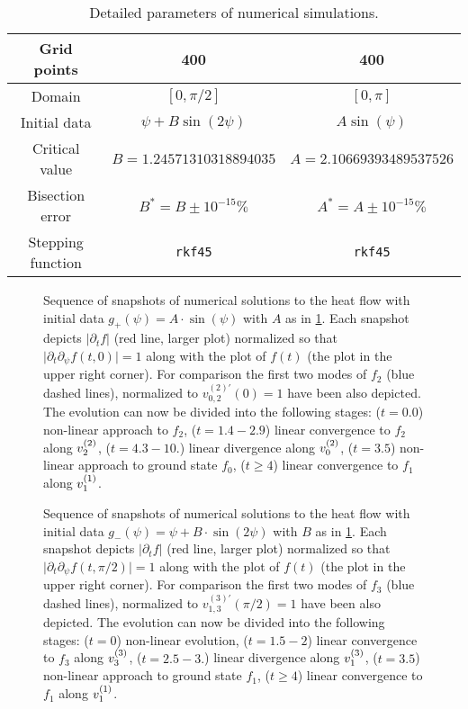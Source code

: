 \begin{table}[ht]
  \centering
  \begin{tabular}{|c|c|c|}\hline
    Grid points       & 400                     & 400                     \\\hline
    Domain            & $[0,\pi/2]$             & $[0,\pi]$               \\\hline
    Initial data      & $\psi+B\sin(2\psi)$     & $A\sin(\psi)$           \\\hline
    Critical value    & $B=1.24571310318894035$ & $A=2.10669393489537526$ \\\hline
    Bisection error   & $B^*=B\pm10^{-15}\%$    & $A^*=A\pm10^{-15}\%$    \\\hline
    Stepping function & \verb|rkf45|            & \verb|rkf45|            \\\hline
  \end{tabular}
  \caption{Detailed parameters of numerical simulations.}
  \label{tab:num_details}
\end{table}


\begin{figure}[h]
  \centering \advance\leftskip-3cm
  
  \caption{Sequence of snapshots of numerical solutions to the heat
    flow with initial data $g_+(\psi)=A\cdot \sin(\psi)$ with $A$ as
    in \ref{tab:num_details}. Each snapshot depicts $\lvert \partial_t
    f\rvert$ (red line, larger plot) normalized so that
    $\lvert \partial_t\partial_\psi f(t,0)\rvert=1$ along with the
    plot of $f(t)$ (the plot in the upper right corner). For
    comparison the first two modes of $f_2$ (blue dashed lines),
    normalized to $v_{0,2}^{(2)\prime}(0)=1$ have been also
    depicted. The evolution can now be divided into the following
    stages: ($t=0.0$) non-linear approach to $f_2$, ($t=1.4-2.9$)
    linear convergence to $f_2$ along $v_{2}^{(2)}$, ($t=4.3-10.$)
    linear divergence along $v_{0}^{(2)}$, ($t=3.5$) non-linear approach
    to ground state $f_0$, ($t\ge4$) linear convergence to $f_1$ along
    $v_{1}^{(1)}$.}\label{fig:snapshot_f2}
\end{figure}

\begin{figure}[h]
  \centering \advance\leftskip-3cm
  
  \caption{Sequence of snapshots of numerical solutions to the heat
    flow with initial data $g_-(\psi)=\psi+B\cdot \sin(2\psi)$ with
    $B$ as in \ref{tab:num_details}. Each snapshot depicts
    $\lvert \partial_t f\rvert$ (red line, larger plot) normalized so
    that $\lvert \partial_t\partial_\psi f(t,\pi/2)\rvert=1$ along
    with the plot of $f(t)$ (the plot in the upper right corner). For
    comparison the first two modes of $f_3$ (blue dashed lines),
    normalized to $v_{1,3}^{(3)\prime}(\pi/2)=1$ have been also
    depicted. The evolution can now be divided into the following
    stages: ($t=0$) non-linear evolution, ($t=1.5-2$) linear
    convergence to $f_3$ along $v_{3}^{(3)}$, ($t=2.5-3.$) linear
    divergence along $v_{1}^{(3)}$, ($t=3.5$) non-linear approach to
    ground state $f_1$, ($t\ge4$) linear convergence to $f_1$ along
    $v_{1}^{(1)}$.}\label{fig:snapshot_f3}
\end{figure}

